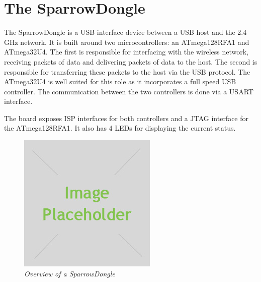 \section{The SparrowDongle}

The SparrowDongle is a USB interface device between a USB host and the 2.4 GHz
network. It is built around two microcontrollers: an ATmega128RFA1 and 
ATmega32U4. The first is responsible for interfacing with the wireless network,
receiving packets of data and delivering packets of data to the host. The 
second is responsible for transferring these packets to the host via the USB 
protocol. The ATmega32U4 is well suited for this role as it incorporates a full
speed USB controller. The communication between the two controllers is done via
a USART interface.

The board exposes ISP interfaces for both controllers and a JTAG interface for
the ATmega128RFA1. It also has 4 LEDs for displaying the current status.



\begin{figure}[ht]
	\begin{center}
		\includegraphics{img/placeholder.jpg}
	\end{center}
	\caption{\small \itshape{Overview of a SparrowDongle}}
\end{figure}

